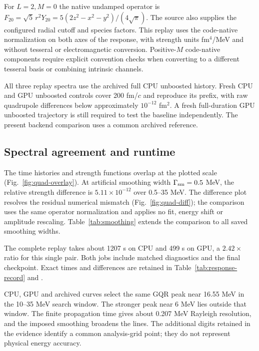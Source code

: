 \documentclass[11pt,a4paper]{article}
\begin{document}
For $L=2,M=0$ the native undamped operator is
$F_{20}=\sqrt{5}\,r^2Y_{20}=5(2z^2-x^2-y^2)/(4\sqrt{\pi})$.
The source also supplies the configured radial cutoff and species factors.
This replay uses the code-native normalization on both axes of the response,
with strength units fm$^4$/MeV and without tesseral or electromagnetic
conversion. Positive-$M$ code-native
components require explicit convention checks when converting to a
different tesseral basis or combining intrinsic channels.

All three replay spectra use the archived full CPU unboosted history.
Fresh CPU and GPU unboosted controls cover 200 fm/$c$ and reproduce its
prefix, with raw quadrupole differences below approximately
$10^{-12}$ fm$^2$. A fresh full-duration GPU unboosted trajectory is
still required to test the baseline independently. The present backend
comparison uses a common archived reference.

\subsection{Spectral agreement and runtime}
The time histories and strength functions overlap at the plotted scale
(Fig.~\ref{fig:quad-overlay}). At artificial smoothing width
$\Gamma_{\rm sm}=0.5$ MeV, the relative strength difference is
$5.11\times10^{-12}$ over 0.5--35 MeV. The difference plot resolves
the residual numerical mismatch (Fig.~\ref{fig:quad-diff}); the comparison
uses the same operator normalization and applies no fit, energy shift or
amplitude rescaling. Table~\ref{tab:smoothing} extends the comparison to
all saved smoothing widths.

The complete replay takes about 1207 s on CPU and 499 s on GPU, a
$2.42\times$ ratio for this single pair. Both jobs include matched
diagnostics and the final checkpoint. Exact times and differences are
retained in Table~\ref{tab:response-record} and
.

\begin{table}[htbp]\centering\small

\caption{Relative $L_2$ strength differences for every smoothing width used in the archived plot. GPU comparisons use 0.5--35 MeV; archived reanalysis checks the saved CSV energy range. No fit, energy shift or amplitude rescaling is applied.}
\label{tab:smoothing}\end{table}

CPU, GPU and archived curves select the same GQR peak near 16.55 MeV
in the 10--35 MeV search window. The stronger peak near 6 MeV lies outside
that window. The finite propagation time gives about 0.207 MeV Rayleigh
resolution, and the imposed smoothing broadens the lines. The additional
digits retained in the evidence identify a common analysis-grid point;
they do not represent physical energy accuracy.
\end{document}
